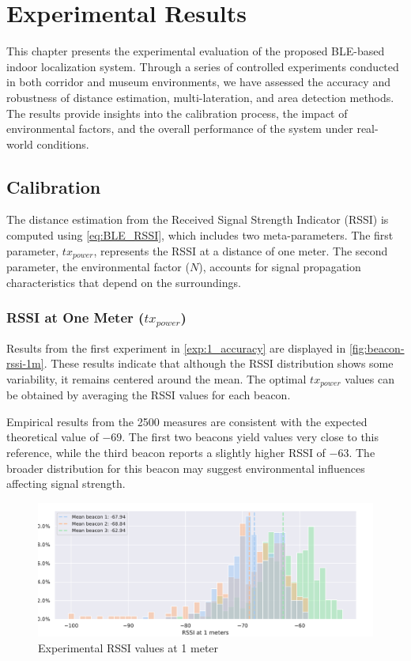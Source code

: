 \chapter{Experimental Results}
\label{chap:results}

This chapter presents the experimental evaluation of the proposed BLE-based indoor localization system. Through a series of controlled experiments conducted in both corridor and museum environments, we have assessed the accuracy and robustness of distance estimation, multi-lateration, and area detection methods. The results provide insights into the calibration process, the impact of environmental factors, and the overall performance of the system under real-world conditions.

\section{Calibration}
The distance estimation from the Received Signal Strength Indicator (RSSI) is computed using \autoref{eq:BLE_RSSI}, which includes two meta-parameters. The first parameter, $tx_{power}$, represents the RSSI at a distance of one meter. The second parameter, the environmental factor ($N$), accounts for signal propagation characteristics that depend on the surroundings.

\subsection{RSSI at One Meter ($tx_{power}$)}
Results from the first experiment in \autoref{exp:1_accuracy} are displayed in \autoref{fig:beacon-rssi-1m}. These results indicate that although the RSSI distribution shows some variability, it remains centered around the mean. The optimal $tx_{power}$ values can be obtained by averaging the RSSI values for each beacon.

Empirical results from the 2500 measures are consistent with the expected theoretical value of $-69$. The first two beacons yield values very close to this reference, while the third beacon reports a slightly higher RSSI of $-63$. The broader distribution for this beacon may suggest environmental influences affecting signal strength.

\begin{figure}[h]
    \centering
    \includegraphics[width=\linewidth]{assets/beacon-rssi-1m.pdf}
    \caption{Experimental RSSI values at 1 meter}
    \label{fig:beacon-rssi-1m}
\end{figure}

